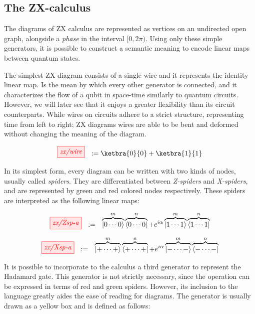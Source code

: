 \subsection{The ZX-calculus}
The diagrams of  ZX calculus are represented as vertices on an undirected
open graph, alongside a \emph{phase} in the interval $[0,2\pi)$. Using only
these simple generators, it is possible to construct a semantic meaning to
encode linear maps between quantum states.

The simplest ZX diagram consists of a single wire and it represents the identity
linear map. Is the mean by which every other generator is connected, and it
characterizes the flow of a qubit in space-time similarly to quantum circuits.
However, we will later see that it enjoys a greater flexibility than its circuit
counterparts. While wires on circuits adhere to a strict structure, representing
time from left to right; ZX diagrams wires are able to be bent and deformed without
changing the meaning of the diagram.

\begin{equation*}
\tikzfig{zx/wire}\ \ := \ketbra{0}{0} + \ketbra{1}{1}
\end{equation*}

In its simplest form, every diagram can be written with two kinds of nodes,
usually called \emph{spiders}. They are differentiated between \emph{Z-spiders}
and \emph{X-spiders}, and are represented by green and red colored nodes
respectively. These spiders are interpreted as the following linear maps:

\begin{equation*}\label{eq:Z-spider-def}
\tikzfig{zx/Zsp-a} \ \ :=\ \ \overbrace{\ket{0 \cdots 0}}^m\overbrace{\bra{0 \cdots 0}}^n + e^{i \alpha} \overbrace{\ket{1 \cdots 1}}^m\overbrace{\bra{1 \cdots 1}}^n
\end{equation*}

\begin{equation*}
\tikzfig{zx/Xsp-a} \ \ :=\ \ \overbrace{\ket{+ \cdots +}}^m\overbrace{\bra{+ \cdots +}}^n + e^{i \alpha} \overbrace{\ket{- \cdots -}}^m\overbrace{\bra{- \cdots -}}^n
\end{equation*}

It is possible to incorporate to the calculus a third generator to represent the
Hadamard gate. This generator is not strictly necessary, since the operation can
be expressed in terms of red and green spiders. However, its inclusion to the
language greatly aides the ease of reading for diagrams. The generator is usually
drawn as a yellow box and is defined as follows:


